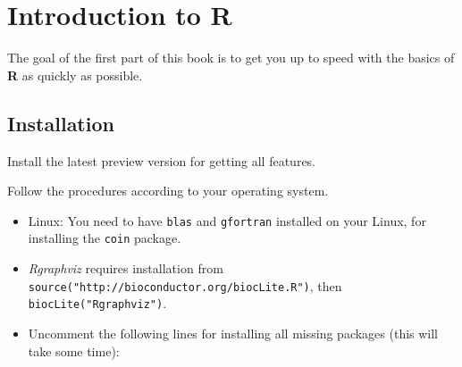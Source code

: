 \documentclass[
]{book}
\providecommand{\tightlist}{%
  \setlength{\itemsep}{0pt}\setlength{\parskip}{0pt}}
\begin{document}
\hypertarget{r-intro}{%
\chapter{Introduction to R}\label{r-intro}}

The goal of the first part of this book is to get you up to speed with the basics of \textbf{R} as quickly as possible.

\hypertarget{installation}{%
\section{Installation}\label{installation}}

Install the latest preview version for getting all features.

Follow the procedures according to your operating system.

\begin{itemize}
\tightlist
\item
  Linux: You need to have \texttt{blas} and \texttt{gfortran} installed on your Linux, for installing the \texttt{coin} package.
\item
  \emph{Rgraphviz} requires installation from \texttt{source("http://bioconductor.org/biocLite.R")}, then \texttt{biocLite("Rgraphviz")}.
\item
  Uncomment the following lines for installing all missing packages (this will take some time):
\end{itemize}
\end{document}
